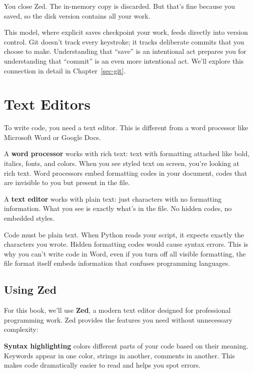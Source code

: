 \documentclass[
  letterpaper,
  DIV=11,
  numbers=noendperiod]{scrreprt}
\begin{document}
You close Zed. The in-memory copy is discarded. But that's fine because
you saved, so the disk version contains all your work.

This model, where explicit saves checkpoint your work, feeds directly
into version control. Git doesn't track every keystroke; it tracks
deliberate commits that you choose to make. Understanding that ``save''
is an intentional act prepares you for understanding that ``commit'' is
an even more intentional act. We'll explore this connection in detail in
Chapter~\ref{sec-git}.

\section{Text Editors}\label{text-editors}

To write code, you need a text editor. This is different from a word
processor like Microsoft Word or Google Docs.

A \textbf{word processor} works with rich text: text with formatting
attached like bold, italics, fonts, and colors. When you see styled text
on screen, you're looking at rich text. Word processors embed formatting
codes in your document, codes that are invisible to you but present in
the file.

A \textbf{text editor} works with plain text: just characters with no
formatting information. What you see is exactly what's in the file. No
hidden codes, no embedded styles.

Code must be plain text. When Python reads your script, it expects
exactly the characters you wrote. Hidden formatting codes would cause
syntax errors. This is why you can't write code in Word, even if you
turn off all visible formatting, the file format itself embeds
information that confuses programming languages.

\subsection{Using Zed}\label{using-zed}

For this book, we'll use \textbf{Zed}, a modern text editor designed for
professional programming work. Zed provides the features you need
without unnecessary complexity:

\textbf{Syntax highlighting} colors different parts of your code based
on their meaning. Keywords appear in one color, strings in another,
comments in another. This makes code dramatically easier to read and
helps you spot errors.
\end{document}
